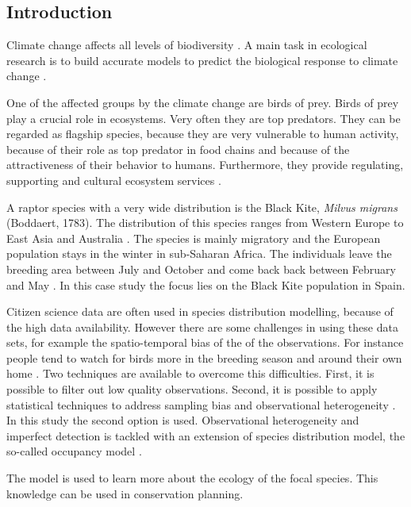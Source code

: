\begin{multicols}{2}
	
\section{Introduction}
Climate change affects all levels of biodiversity \parencite{Bellard2012, Garcia2014}. A main task in ecological research is to build accurate models to predict the biological response to climate change \parencite{Urban2016,Araujo2006}. 

One of the affected groups by the climate change are birds of prey. Birds of prey play a crucial role in ecosystems. Very often they are top predators. They can be regarded as flagship species, because they are very vulnerable to human activity, because of their role as top predator in food chains and because of the attractiveness of their behavior to humans. Furthermore, they provide regulating, supporting and cultural ecosystem services \parencite{Donazar2016}.

A raptor species with a very wide distribution is the Black Kite, \textit{Milvus migrans} (Boddaert, 1783). The distribution of this species ranges from Western Europe to East Asia and Australia \parencite{BirdLife2021}. The species is mainly migratory and the European population stays in the winter in sub-Saharan Africa. The individuals leave the breeding area between July and October and come back back between February and May \parencite{Panuccio2014, BirdLife2021}. In this case study the focus lies on the Black Kite population in Spain. 

Citizen science data are often used in species distribution modelling, because of the high data availability. However there are some challenges in using these data sets, for example the spatio-temporal bias of the of the observations. For instance people tend to watch for birds more in the breeding season and around their own home \parencite{Robinson2018, Reich2018}. Two techniques are available to overcome this difficulties. First, it is possible to filter out low quality observations. Second, it is possible to apply statistical techniques to address sampling bias and observational heterogeneity \parencite{Steen2019}. In this study the second option is used. Observational heterogeneity and imperfect detection is tackled with an extension of species distribution model, the so-called occupancy model \parencite{MacKenzie2002}.

The model is used to learn more about the ecology of the focal species. This knowledge can be used in conservation planning.  


\end{multicols}
